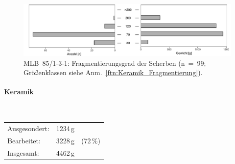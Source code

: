 \begin{figure}[tb]
	\centering
	\includegraphics[width=\textwidth]{fig/9-1_MLB85-131_Fragmentierung_2.pdf}
	\caption{MLB~85/1-3-1: Fragmentierungsgrad der Scherben (n~=~99; Größenklassen siehe Anm.~\ref{ftn:Keramik_Fragmentierung}).}
	\label{fig:Fragmenierung_MLB85-131}
\end{figure}

\columnbreak\paragraph{Keramik\vspace{.5em}}\mbox{}\\
\begin{tabular}{@{}lrl@{}}
Ausgesondert: & 1234\,g & \\
Bearbeitet: & 3228\,g & (72\,\%) \\
Insgesamt: & 4462\,g & \\
\end{tabular} 

